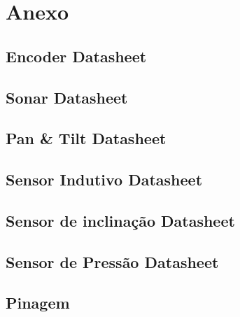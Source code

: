 


\section{Anexo}
\subsection{Encoder Datasheet}

\subsection{Sonar Datasheet}

\subsection{Pan \& Tilt Datasheet}

\subsection{Sensor Indutivo Datasheet}

\subsection{Sensor de inclinação Datasheet}

\subsection{Sensor de Pressão Datasheet}

\subsection{Pinagem}
